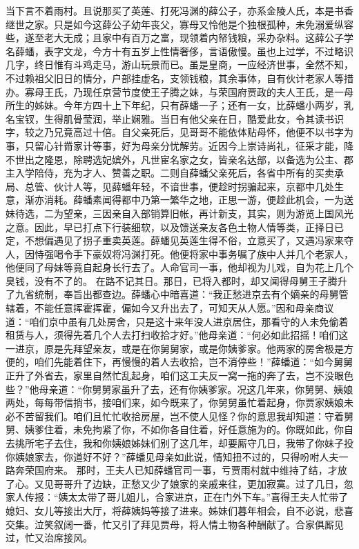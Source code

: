 \documentclass[12pt,oneside]{book}
\begin{document}
当下言不着雨村。且说那买了英莲、打死冯渊的薛公子，亦系金陵人氏，本是书香继世之家。只是如今这薛公子幼年丧父，寡母又怜他是个独根孤种，未免溺爱纵容些，遂至老大无成；且家中有百万之富，现领着内帑钱粮，采办杂料。这薛公子学名薛蟠，表字文龙，今方十有五岁上性情奢侈，言语傲慢。虽也上过学，不过略识几字，终日惟有斗鸡走马，游山玩景而已。虽是皇商，一应经济世事，全然不知，不过赖祖父旧日的情分，户部挂虚名，支领钱粮，其余事体，自有伙计老家人等措办。寡母王氏，乃现任京营节度使王子腾之妹，与荣国府贾政的夫人王氏，是一母所生的姊妹。今年方四十上下年纪，只有薛蟠一子；还有一女，比薛蟠小两岁，乳名宝钗，生得肌骨莹润，举止娴雅。当日有他父亲在日，酷爱此女，令其读书识字，较之乃兄竟高过十倍。自父亲死后，见哥哥不能依体贴母怀，他便不以书字为事，只留心针黹家计等事，好为母亲分忧解劳。近因今上崇诗尚礼，征采才能，降不世出之隆恩，除聘选妃嫔外，凡世宦名家之女，皆亲名达部，以备选为公主、郡主入学陪侍，充为才人、赞善之职。二则自薛蟠父亲死后，各省中所有的买卖承局、总管、伙计人等，见薛蟠年轻，不谙世事，便趁时拐骗起来，京都中几处生意，渐亦消耗。薛蟠素闻得都中乃第一繁华之地，正思一游，便趁此机会，一为送妹待选，二为望亲，三因亲自入部销算旧帐，再计新支，其实，则为游览上国风光之意。因此，早已打点下行装细软，以及馈送亲友各色土物人情等类，正择日已定，不想偏遇见了拐子重卖英莲。薛蟠见英莲生得不俗，立意买了，又遇冯家来夺人，因恃强喝令手下豪奴将冯渊打死。他便将家中事务嘱了族中人并几个老家人，他便同了母妹等竟自起身长行去了。人命官司一事，他却视为儿戏，自为花上几个臭钱，没有不了的。
在路不记其日。那日，已将入都时，却又闻得母舅王子腾升了九省统制，奉旨出都查边。薛蟠心中暗喜道：“我正愁进京去有个嫡亲的母舅管辖着，不能任意挥霍挥霍，偏如今又升出去了，可知天从人愿。”因和母亲商议道：“咱们京中虽有几处房舍，只是这十来年没人进京居住，那看守的人未免偷着租赁与人，须得先着几个人去打扫收拾才好。”他母亲道：“何必如此招摇！咱们这一进京，原是先拜望亲友，或是在你舅舅家，或是你姨爹家。他两家的房舍极是方便的，咱们先能着住下，再慢慢的着人去收拾，岂不消停些！”薛蟠道：“如今舅舅正升了外省去，家里自然忙乱起身，咱们这工夫反一窝一拖的奔了去，岂不没眼色些？”他母亲道：“你舅舅家虽升了去，还有你姨爹家。况这几年来，你舅舅、姨娘两处，每每带信捎书，接咱们来，如今既来了，你舅舅虽忙着起身，你贾家姨娘未必不苦留我们。咱们且忙忙收拾房屋，岂不使人见怪？你的意思我却知道：守着舅舅、姨爹住着，未免拘紧了你，不如你各自住着，好任意施为的。你既如此，你自去挑所宅子去住，我和你姨娘姊妹们别了这几年，却要厮守几日，我带了你妹子投你姨娘家去，你道好不好？”薛蟠见母亲如此说，情知扭不过的，只得吩咐人夫一路奔荣国府来。
那时，王夫人已知薛蟠官司一事，亏贾雨村就中维持了结，才放了心。又见哥哥升了边缺，正愁又少了娘家的亲戚来往，更加寂寞。过了几日，忽家人传报：“姨太太带了哥儿姐儿，合家进京，正在门外下车。”喜得王夫人忙带了媳妇、女儿等接出大厅，将薛姨妈等接了进来。姊妹们暮年相会，自不必说，悲喜交集。泣笑叙阔一番，忙又引了拜见贾母，将人情土物各种酬献了。合家俱厮见过，忙又治席接风。
\end{document}
